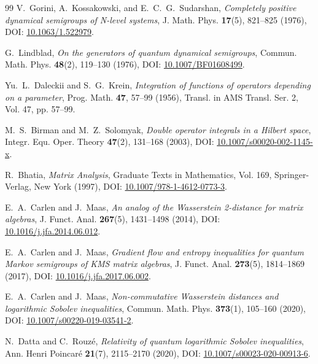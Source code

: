 \documentclass[11pt,a4paper]{article}
\theoremstyle{plain}
\theoremstyle{definition}
\begin{document}
\begin{thebibliography}{99}
V.~Gorini, A.~Kossakowski, and E.~C.~G.~Sudarshan, \textit{Completely positive dynamical semigroups of N-level systems}, J. Math. Phys. \textbf{17}(5), 821--825 (1976), DOI: \href{https://doi.org/10.1063/1.522979}{10.1063/1.522979}.

G.~Lindblad, \textit{On the generators of quantum dynamical semigroups}, Commun. Math. Phys. \textbf{48}(2), 119--130 (1976), DOI: \href{https://doi.org/10.1007/BF01608499}{10.1007/BF01608499}.

Yu.~L.~Daleckii and S.~G.~Krein, \textit{Integration of functions of operators depending on a parameter}, Prog. Math. \textbf{47}, 57--99 (1956), Transl. in AMS Transl. Ser. 2, Vol. 47, pp. 57--99.

M.~S.~Birman and M.~Z.~Solomyak, \textit{Double operator integrals in a Hilbert space}, Integr. Equ. Oper. Theory \textbf{47}(2), 131--168 (2003), DOI: \href{https://doi.org/10.1007/s00020-002-1145-x}{10.1007/s00020-002-1145-x}.

R.~Bhatia, \textit{Matrix Analysis}, Graduate Texts in Mathematics, Vol. 169, Springer-Verlag, New York (1997), DOI: \href{https://doi.org/10.1007/978-1-4612-0773-3}{10.1007/978-1-4612-0773-3}.

E.~A.~Carlen and J.~Maas, \textit{An analog of the Wasserstein 2-distance for matrix algebras}, J. Funct. Anal. \textbf{267}(5), 1431--1498 (2014), DOI: \href{https://doi.org/10.1016/j.jfa.2014.06.012}{10.1016/j.jfa.2014.06.012}.

E.~A.~Carlen and J.~Maas, \textit{Gradient flow and entropy inequalities for quantum Markov semigroups of KMS matrix algebras}, J. Funct. Anal. \textbf{273}(5), 1814--1869 (2017), DOI: \href{https://doi.org/10.1016/j.jfa.2017.06.002}{10.1016/j.jfa.2017.06.002}.

E.~A.~Carlen and J.~Maas, \textit{Non-commutative Wasserstein distances and logarithmic Sobolev inequalities}, Commun. Math. Phys. \textbf{373}(1), 105--160 (2020), DOI: \href{https://doi.org/10.1007/s00220-019-03541-2}{10.1007/s00220-019-03541-2}.

N.~Datta and C.~Rouz\'{e}, \textit{Relativity of quantum logarithmic Sobolev inequalities}, Ann. Henri Poincar\'{e} \textbf{21}(7), 2115--2170 (2020), DOI: \href{https://doi.org/10.1007/s00023-020-00913-6}{10.1007/s00023-020-00913-6}.


\end{thebibliography}
\end{document}
